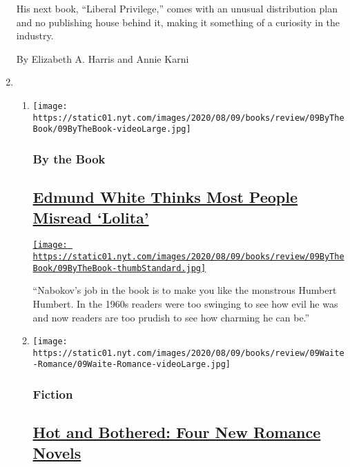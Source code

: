\begin{enumerate}
  His next book, ``Liberal Privilege,'' comes with an unusual
  distribution plan and no publishing house behind it, making it
  something of a curiosity in the industry.

  By Elizabeth A. Harris and Annie Karni
\item
  \begin{enumerate}
  \def\labelenumii{\arabic{enumii}.}
  \item
    \texttt{[image: https://static01.nyt.com/images/2020/08/09/books/review/09ByTheBook/09ByTheBook-videoLarge.jpg]}

    \hypertarget{by-the-book}{%
    \subsubsection{By the Book}\label{by-the-book}}

    \hypertarget{edmund-white-thinks-most-people-misread-lolita}{%
    \subsection{\texorpdfstring{\href{/2020/08/06/books/review/edmund-white-by-the-book-interview.html}{Edmund
    White Thinks Most People Misread
    `Lolita'}}{Edmund White Thinks Most People Misread `Lolita'}}\label{edmund-white-thinks-most-people-misread-lolita}}

    \href{/2020/08/06/books/review/edmund-white-by-the-book-interview.html}{\texttt{[image: https://static01.nyt.com/images/2020/08/09/books/review/09ByTheBook/09ByTheBook-thumbStandard.jpg]}}

    ``Nabokov's job in the book is to make you like the monstrous
    Humbert Humbert. In the 1960s readers were too swinging to see how
    evil he was and now readers are too prudish to see how charming he
    can be.''
  \item
    \texttt{[image: https://static01.nyt.com/images/2020/08/09/books/review/09Waite-Romance/09Waite-Romance-videoLarge.jpg]}

    \hypertarget{fiction}{%
    \subsubsection{Fiction}\label{fiction}}

    \hypertarget{hot-and-bothered-four-new-romance-novels}{%
    \subsection{\texorpdfstring{\href{/2020/08/07/books/review/summer-romance-novels-vanessa-riley.html}{Hot
    and Bothered: Four New Romance
    Novels}}{Hot and Bothered: Four New Romance Novels}}\label{hot-and-bothered-four-new-romance-novels}}


\end{enumerate}
\end{enumerate}
